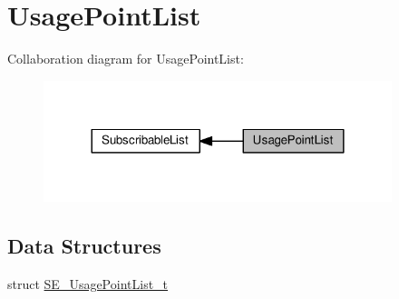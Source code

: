\hypertarget{group__UsagePointList}{}\section{Usage\+Point\+List}
\label{group__UsagePointList}
Collaboration diagram for Usage\+Point\+List\+:\nopagebreak
\begin{figure}[H]
\begin{center}
\leavevmode
\includegraphics[width=288pt]{group__UsagePointList}
\end{center}
\end{figure}
\subsection*{Data Structures}
\begin{DoxyCompactItemize}
\item 
struct \hyperlink{structSE__UsagePointList__t}{S\+E\+\_\+\+Usage\+Point\+List\+\_\+t}
\end{DoxyCompactItemize}
